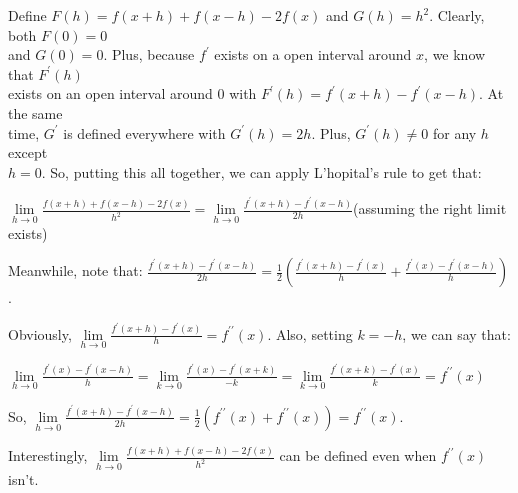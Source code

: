 \documentclass{book}
\newcommand{\pracTwo}{
   \color{Orange}%
   \fontsize{12}{14}\selectfont%
}
\newenvironment{myIndent}{%
   \begin{adjustwidth}{2.5em}{0em}%
}{%
   \end{adjustwidth}%
}
\newcommand{\pprime}{{\prime\prime}}
\newcommand{\retTwo}{\hfill\bigbreak}
\begin{document}
{\begin{myIndent}\pracTwo
   Define $F(h) = f(x + h) + f(x - h) - 2f(x)$ and $G(h) = h^2$. Clearly, both $F(0) = 0$\\ and $G(0) = 0$. Plus, because $f^\prime$ exists on a open interval around $x$, we know that $F^\prime(h)$\\ exists on an open interval around $0$ with $F^\prime(h) = f^\prime(x + h) - f^\prime(x - h)$. At the same\\ time, $G^\prime$ is defined everywhere with $G^\prime(h) = 2h$. Plus, $G^\prime(h) \neq 0$ for any $h$ except\\ $h = 0$. So, putting this all together, we can apply L'hopital's rule to get that:\\ [-6pt]

   {\center $ \lim\limits_{h \rightarrow 0}\frac{f(x+h) + f(x-h) - 2f(x)}{h^2} = \lim\limits_{h \rightarrow 0}\frac{f^\prime(x + h) - f^\prime(x - h)}{2h}$\quad\quad(assuming the right limit exists)\retTwo\par}

   Meanwhile, note that: $\frac{f^\prime(x + h) - f^\prime(x - h)}{2h} = \frac{1}{2}\left(\frac{f^\prime(x + h) - f^\prime(x)}{h} + \frac{f^\prime(x) - f^\prime(x-h)}{h}\right)$.\retTwo

   Obviously, $\lim\limits_{h\rightarrow 0}\frac{f^\prime(x + h) - f^\prime(x)}{h} = f^\pprime(x)$. Also, setting $k = -h$, we can say that:
   
   {\center$\lim\limits_{h\rightarrow 0}\frac{f^\prime(x) - f^\prime(x-h)}{h} = \lim\limits_{k\rightarrow 0}\frac{f^\prime(x) - f^\prime(x+k)}{-k} = \lim\limits_{k\rightarrow 0}\frac{f^\prime(x + k) - f^\prime(x)}{k} = f^\pprime(x)$\retTwo\par}

   So, $\lim\limits_{h \rightarrow 0}\frac{f^\prime(x + h) - f^\prime(x - h)}{2h} = \frac{1}{2}(f^\pprime(x) + f^\pprime(x)) = f^\pprime(x)$.\retTwo
\end{myIndent}}

Interestingly, $\lim\limits_{h \rightarrow 0}\frac{f(x+h) + f(x-h) - 2f(x)}{h^2}$ can be defined even when $f^\pprime(x)$ isn't.
\end{document}

